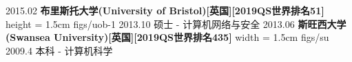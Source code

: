 %
%
%
%
%
%
\begin{educations}
	\education
    {2015.02}			{\textbf{布里斯托大学(University of Bristol)[英国][2019QS世界排名51]}}
    {height = 1.5cm}			{figs/uob-1}
    {2013.10}		{硕士 - 计算机网络与安全 }
    {} {}
  \universitySeparator
    \education
	  {2013.06}			{\textbf{斯旺西大学(Swansea University)[英国][2019QS世界排名435]}}
	  {width = 1.5cm}			{figs/su}
	  {2009.4}		{本科 - 计算机科学}
	  {} {}
\end{educations}
